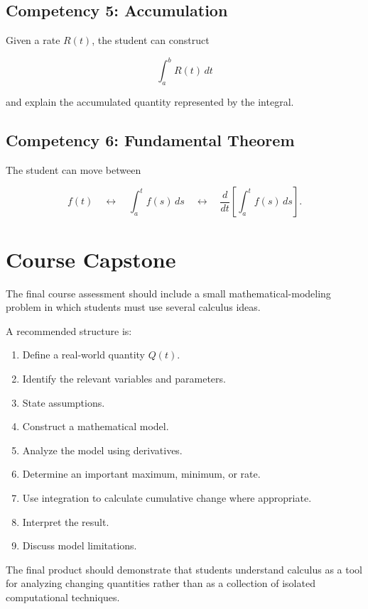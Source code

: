 \documentclass[11pt]{article}
\begin{document}
\subsection*{Competency 5: Accumulation}

Given a rate $R(t)$, the student can construct

\[
\int_a^b R(t)\,dt
\]

and explain the accumulated quantity represented by the integral.

\subsection*{Competency 6: Fundamental Theorem}

The student can move between

\[
f(t)
\quad\leftrightarrow\quad
\int_a^t f(s)\,ds
\quad\leftrightarrow\quad
\frac{d}{dt}
\left[
\int_a^t f(s)\,ds
\right].
\]

\section{Course Capstone}

The final course assessment should include a small mathematical-modeling
problem in which students must use several calculus ideas.

A recommended structure is:

\begin{enumerate}
    \item Define a real-world quantity $Q(t)$.
    \item Identify the relevant variables and parameters.
    \item State assumptions.
    \item Construct a mathematical model.
    \item Analyze the model using derivatives.
    \item Determine an important maximum, minimum, or rate.
    \item Use integration to calculate cumulative change where appropriate.
    \item Interpret the result.
    \item Discuss model limitations.
\end{enumerate}

The final product should demonstrate that students understand calculus as a
tool for analyzing changing quantities rather than as a collection of
isolated computational techniques.
\end{document}
